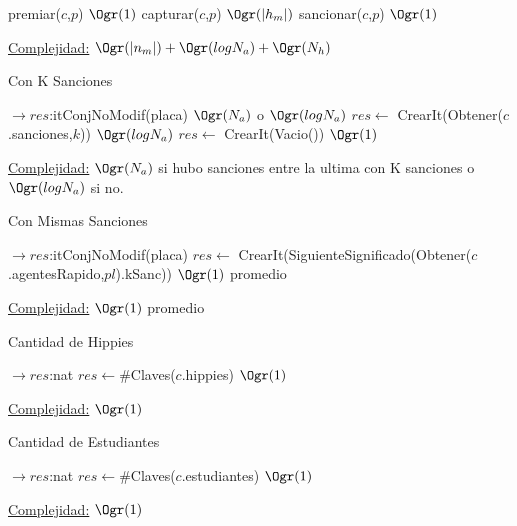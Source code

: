 \begin{Algoritmos}
\begin{algorithm}[H]
\begin{algorithmic}[1]
	\State premiar($c$,$p$) \Comment $\Ogr(1)$
	\State capturar($c$,$p$) \Comment $\Ogr(|h_m|)$
	\State sancionar($c$,$p$) \Comment $\Ogr(1)$
\EndProcedure
\end{algorithmic}
\underline{Complejidad:} $\Ogr(|n_m|) + \Ogr(log N_a) + \Ogr(N_h)$
\end{algorithm}


\begin{algorithm}[H]
\caption{Con K Sanciones}
\begin{algorithmic}[1]
 $\to res$:itConjNoModif(placa)
	 \Comment $\Ogr(N_a)$ o $\Ogr(log N_a)$
		\State $res \gets$ CrearIt(Obtener($c$.sanciones,$k$)) \Comment $\Ogr(log N_a)$
	\Else
		\State $res \gets$ CrearIt(Vacio()) \Comment $\Ogr(1)$
	\EndIf
\EndProcedure
\end{algorithmic}
\underline{Complejidad:} $\Ogr(N_a)$ si hubo sanciones entre la ultima con K sanciones o $\Ogr(log N_a)$ si no.
\end{algorithm}

\begin{algorithm}[H]
\caption{Con Mismas Sanciones}
\begin{algorithmic}[1]
 $\to res$:itConjNoModif(placa)
	\State $res \gets$ CrearIt(SiguienteSignificado(Obtener($c$.agentesRapido,$pl$).kSanc)) \Comment $\Ogr(1)$ promedio
\EndProcedure
\end{algorithmic}
\underline{Complejidad:} $\Ogr(1)$ promedio
\end{algorithm}


\begin{algorithm}[H]
\caption{Cantidad de Hippies}
\begin{algorithmic}[1]
 $\to res$:nat
	\State $res \gets \#$Claves($c$.hippies) \Comment $\Ogr(1)$
\EndProcedure
\end{algorithmic}
\underline{Complejidad:} $\Ogr(1)$
\end{algorithm}

\begin{algorithm}[H]
\caption{Cantidad de Estudiantes}
\begin{algorithmic}[1]
 $\to res$:nat
	\State $res \gets \#$Claves($c$.estudiantes) \Comment $\Ogr(1)$
\EndProcedure
\end{algorithmic}
\underline{Complejidad:} $\Ogr(1)$
\end{algorithm}



\end{Algoritmos}
